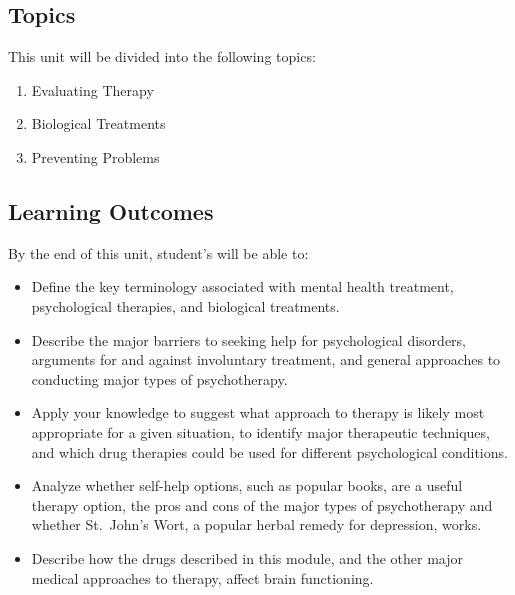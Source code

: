 \documentclass[
]{book}
\providecommand{\tightlist}{%
  \setlength{\itemsep}{0pt}\setlength{\parskip}{0pt}}
\begin{document}
\hypertarget{topics-10}{%
\subsection*{Topics}\label{topics-10}}

This unit will be divided into the following topics:

\begin{enumerate}
\def\labelenumi{\arabic{enumi}.}
\tightlist
\item
  Evaluating Therapy\\
\item
  Biological Treatments\\
\item
  Preventing Problems
\end{enumerate}

\hypertarget{learning-outcomes-10}{%
\subsection*{Learning Outcomes}\label{learning-outcomes-10}}

By the end of this unit, student's will be able to:

\begin{itemize}
\tightlist
\item
  Define the key terminology associated with mental health treatment, psychological therapies, and biological treatments.\\
\item
  Describe the major barriers to seeking help for psychological disorders, arguments for and against involuntary treatment, and general approaches to conducting major types of psychotherapy.\\
\item
  Apply your knowledge to suggest what approach to therapy is likely most appropriate for a given situation, to identify major therapeutic techniques, and which drug therapies could be used for different psychological conditions.\\
\item
  Analyze whether self-help options, such as popular books, are a useful therapy option, the pros and cons of the major types of psychotherapy and whether St.~John's Wort, a popular herbal remedy for depression, works.\\
\item
  Describe how the drugs described in this module, and the other major medical approaches to therapy, affect brain functioning.
\end{itemize}
\end{document}
